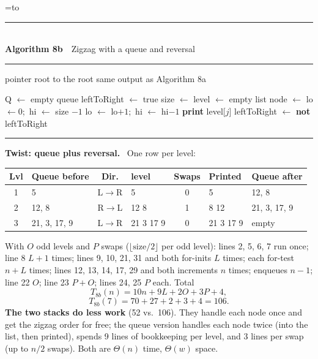 \documentclass[10pt]{article}
\makeatletter
\newcommand{\Init}[1]{\item[\textbf{Initial call:}] #1}
\newenvironment{algo}[2]{\par\noindent\rule{\linewidth}{0.6pt}\\[-0.1em]{\small\textbf{#1}\ \ #2}\\[-0.85em]\rule{\linewidth}{0.3pt}\footnotesize\begin{algorithmic}[1]}{\end{algorithmic}\vspace{-0.7em}\noindent\rule{\linewidth}{0.6pt}\par}
\newcounter{qnum}
\newif\iffirstrow
\newcommand{\qrowh}[2]{\expandafter\gdef\csname qrowh@#1\endcsname{#2}}
\newcommand{\Lcol}[1][0.505]{\par\noindent\setbox\rowbox=\hbox to\linewidth\bgroup\begin{minipage}[t]{#1\linewidth}\vspace{0pt}}
\newcommand{\Rcol}[1][0.47]{\end{minipage}\hfill\begin{minipage}[t]{#1\linewidth}\vspace{0pt}}
\newcommand{\Ecol}{\end{minipage}\egroup
  \iffirstrow\immediate\write\@auxout{\string\qrowh{\theqnum}{\the\dimexpr\ht\rowbox+\dp\rowbox\relax}}\global\firstrowfalse\fi
  \noindent\usebox\rowbox\par\vspace{3pt}}
\newcommand{\pt}[1]{{\bfseries\color{headc}#1}\ }
\makeatother
\begin{document}
\Lcol[0.47]
\begin{algo}{Algorithm 8b}{Zigzag with a queue and reversal}
\Require pointer root to the root
\Ensure same output as Algorithm 8a
\Init{}
    \State \Return
  \EndIf
  \State Q $\gets$ empty queue
  \State {}
  \State leftToRight $\gets$ true
    \State size $\gets$ 
    \State level $\gets$ empty list
      \State node $\gets$ 
      \State {}
        \State {}
      \EndIf
        \State {}
      \EndIf
    \EndFor
      \State lo $\gets 0$;\ hi $\gets$ size $-1$
        \State {}
        \State lo $\gets$ lo$+1$;\ hi $\gets$ hi$-1$
      \EndWhile
    \EndIf
      \State \textbf{print} level[$j$]
    \EndFor
    \State leftToRight $\gets$ \textbf{not} leftToRight
  \EndWhile
\EndProcedure
\end{algo}
\Rcol[0.505]
\pt{Twist: queue plus reversal.} One row per level:\par
{\scriptsize
\begin{tabularx}{\linewidth}{@{}c Y c l c l Y@{}}
\toprule
Lvl & Queue before & Dir. & level & Swaps & Printed & Queue after \\
 & 5 & L$\to$R & 5 & 0 & 5 & 12, 8 \\
2 & 12, 8 & R$\to$L & 12 8 & 1 & 8 12 & 21, 3, 17, 9 \\
3 & 21, 3, 17, 9 & L$\to$R & 21 3 17 9 & 0 & 21 3 17 9 & empty \\
\bottomrule
\end{tabularx}}
{\footnotesize With $O$ odd levels and $P$ swaps ($\lfloor\text{size}/2\rfloor$ per odd level): lines 2, 5, 6, 7 run once; line 8 $L+1$ times; lines 9, 10, 21, 31 and both for-inits $L$ times; each for-test $n+L$ times; lines 12, 13, 14, 17, 29 and both increments $n$ times; enqueues $n-1$; line 22 $O$; line 23 $P+O$; lines 24, 25 $P$ each. Total}
\[T_{8b}(n)=10n+9L+2O+3P+4,\]\[T_{8b}(7)=70+27+2+3+4=106.\]
\textbf{The two stacks do less work} (52 vs.\ 106). They handle each node once and get the zigzag order for free; the queue version handles each node twice (into the list, then printed), spends 9 lines of bookkeeping per level, and 3 lines per swap (up to $n/2$ swaps). Both are $\Theta(n)$ time, $\Theta(w)$ space.
\Ecol
\end{document}
